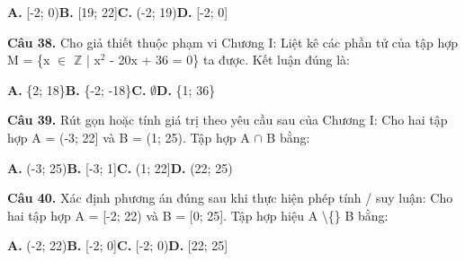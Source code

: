 \documentclass[11pt,a4paper]{article}
\begin{document}
\hspace*{1.5em}\textbf{A.} [-2; 0)\quad\quad \textbf{B.} [19; 22]\quad\quad \textbf{C.} (-2; 19)\quad\quad \textbf{D.} [-2; 0]\par\vspace{2pt}
\textbf{\color{primary} Câu 38.} Cho giả thiết thuộc phạm vi Chương I: Liệt kê các phần tử của tập hợp M = \{x $\in$ $\mathbb{Z}$ | x$^2$ - 20x + 36 = 0\} ta được. Kết luận đúng là:\par
\hspace*{1.5em}\textbf{A.} \{2; 18\}\quad\quad \textbf{B.} \{-2; -18\}\quad\quad \textbf{C.} $\emptyset$\quad\quad \textbf{D.} \{1; 36\}\par\vspace{2pt}
\textbf{\color{primary} Câu 39.} Rút gọn hoặc tính giá trị theo yêu cầu sau của Chương I: Cho hai tập hợp A = (-3; 22] và B = (1; 25). Tập hợp A $\cap$ B bằng:\par
\hspace*{1.5em}\textbf{A.} (-3; 25)\quad\quad \textbf{B.} [-3; 1]\quad\quad \textbf{C.} (1; 22]\quad\quad \textbf{D.} (22; 25)\par\vspace{2pt}
\textbf{\color{primary} Câu 40.} Xác định phương án đúng sau khi thực hiện phép tính / suy luận: Cho hai tập hợp A = [-2; 22) và B = [0; 25]. Tập hợp hiệu A \textbackslash\{\} B bằng:\par
\hspace*{1.5em}\textbf{A.} (-2; 22)\quad\quad \textbf{B.} [-2; 0]\quad\quad \textbf{C.} [-2; 0)\quad\quad \textbf{D.} [22; 25]\par\vspace{2pt}
\end{document}
